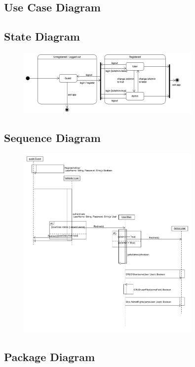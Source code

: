 \subsection{Use Case Diagram}

\subsection{State Diagram}
\begin{figure}[!h]
	\includegraphics[width=0.8\textwidth]{User_Management/User_Management_State_Diagram.png}
\end{figure}

\subsection{Sequence Diagram}
\begin{figure}[!h]
	\includegraphics[width=0.8\textwidth]{User_Management/Sequence_Diagram_User_Management.png}
\end{figure}

\subsection{Package Diagram}

